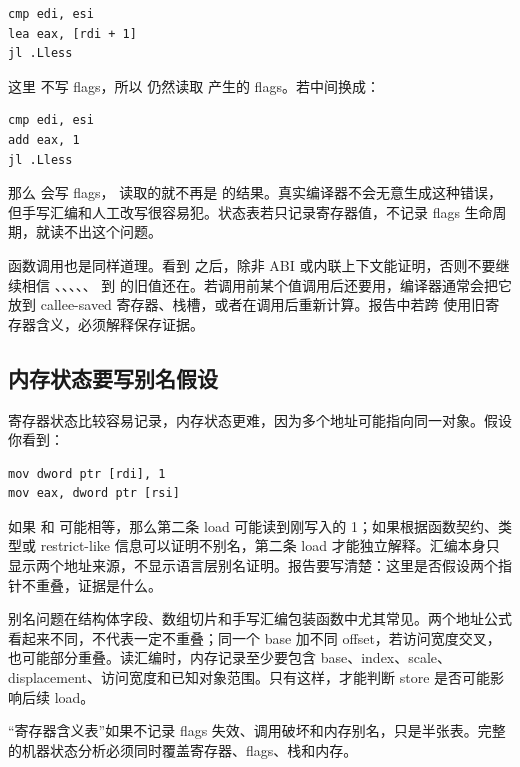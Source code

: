 \begin{lstlisting}
cmp edi, esi
lea eax, [rdi + 1]
jl .Lless
\end{lstlisting}

这里  不写 flags，所以  仍然读取  产生的 flags。若中间换成：

\begin{lstlisting}
cmp edi, esi
add eax, 1
jl .Lless
\end{lstlisting}

那么  会写 flags， 读取的就不再是  的结果。真实编译器不会无意生成这种错误，但手写汇编和人工改写很容易犯。状态表若只记录寄存器值，不记录 flags 生命周期，就读不出这个问题。

函数调用也是同样道理。看到  之后，除非 ABI 或内联上下文能证明，否则不要继续相信 、、、、、 到  的旧值还在。若调用前某个值调用后还要用，编译器通常会把它放到 callee-saved 寄存器、栈槽，或者在调用后重新计算。报告中若跨  使用旧寄存器含义，必须解释保存证据。

\subsection{内存状态要写别名假设}

寄存器状态比较容易记录，内存状态更难，因为多个地址可能指向同一对象。假设你看到：

\begin{lstlisting}
mov dword ptr [rdi], 1
mov eax, dword ptr [rsi]
\end{lstlisting}

如果  和  可能相等，那么第二条 load 可能读到刚写入的 1；如果根据函数契约、类型或 restrict-like 信息可以证明不别名，第二条 load 才能独立解释。汇编本身只显示两个地址来源，不显示语言层别名证明。报告要写清楚：这里是否假设两个指针不重叠，证据是什么。

别名问题在结构体字段、数组切片和手写汇编包装函数中尤其常见。两个地址公式看起来不同，不代表一定不重叠；同一个 base 加不同 offset，若访问宽度交叉，也可能部分重叠。读汇编时，内存记录至少要包含 base、index、scale、displacement、访问宽度和已知对象范围。只有这样，才能判断 store 是否可能影响后续 load。

\begin{warningbox}
“寄存器含义表”如果不记录 flags 失效、调用破坏和内存别名，只是半张表。完整的机器状态分析必须同时覆盖寄存器、flags、栈和内存。
\end{warningbox}

